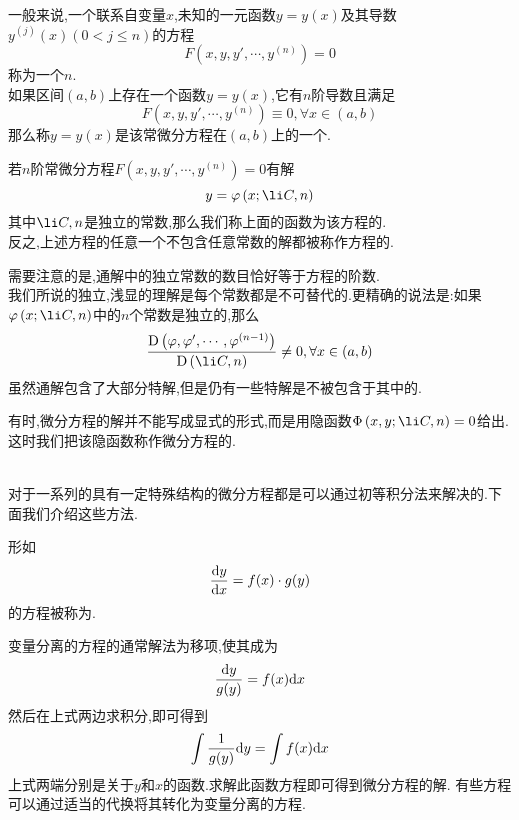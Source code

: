 \documentclass{ctexart}
\begin{document}
\pagestyle{empty}
\begin{center}\large{}\end{center}
\begin{definition}[1.1 定义:常微分方程]
    一般来说,一个联系自变量$x$,未知的一元函数$y=y(x)$及其导数$y^{(j)}(x)(0<j\leqslant n)$的方程
    \[F\left(x,y,y',\cdots,y^{(n)}\right)=0\]
    称为一个$n$.\\
    如果区间$(a,b)$上存在一个函数$y=y(x)$,它有$n$阶导数且满足
    \[F\left(x,y,y',\cdots,y^{(n)}\right)\equiv0,\forall x\in(a,b)\]
    那么称$y=y(x)$是该常微分方程在$(a,b)$上的一个.
\end{definition}
\begin{definition}[1.2 定义:通解与特解]
    若$n$阶常微分方程$F\left(x,y,y',\cdots,y^{(n)}\right)=0$有解
    \[y=\varphi\left(x;\li C,n\right)\]
    其中$\li C,n$是独立的常数,那么我们称上面的函数为该方程的.\\
    反之,上述方程的任意一个不包含任意常数的解都被称作方程的.
\end{definition}\noindent
需要注意的是,通解中的独立常数的数目恰好等于方程的阶数.\\
我们所说的独立,浅显的理解是每个常数都是不可替代的.更精确的说法是:如果$\varphi\left(x;\li C,n\right)$中的$n$个常数是独立的,那么
\[\dfrac{\text{D}\left(\varphi,\varphi',\cdots,\varphi^{(n-1)}\right)}{\text{D}\left(\li C,n\right)}\neq0,\forall x\in (a,b)\]
虽然通解包含了大部分特解,但是仍有一些特解是不被包含于其中的.
\begin{definition}[1.3 定义:通积分]
    有时,微分方程的解并不能写成显式的形式,而是用隐函数$\Phi\left(x,y;\li C,n\right)=0$给出.这时我们把该隐函数称作微分方程的.
\end{definition}\noindent
{}\\
对于一系列的具有一定特殊结构的微分方程都是可以通过初等积分法来解决的.下面我们介绍这些方法.
\begin{definition}[2.1 变量分离的方程]
    形如
    \[\dfrac{\mathrm{d} y}{\mathrm{d} x}=f(x)\cdot g(y)\]
    的方程被称为.
\end{definition}
变量分离的方程的通常解法为移项,使其成为
\[\dfrac{\mathrm{d} y}{g(y)}=f(x)\mathrm{d} x\]
然后在上式两边求积分,即可得到
\[\int\dfrac{1}{g(y)}\mathrm{d} y=\int{f(x)\mathrm{d}x}\]
上式两端分别是关于$y$和$x$的函数.求解此函数方程即可得到微分方程的解.
有些方程可以通过适当的代换将其转化为变量分离的方程.
\end{document}
